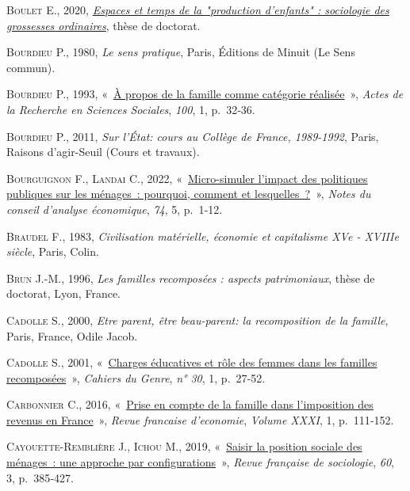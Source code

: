 \documentclass[
  12pt,
]{book}
\newlength{\cslhangindent}
\newenvironment{CSLReferences}[2] %
 {\begin{list}{}{%
  \setlength{\itemindent}{0pt}
  \setlength{\leftmargin}{0pt}
  \setlength{\parsep}{0pt}
  \ifodd #1
   \setlength{\leftmargin}{\cslhangindent}
   \setlength{\itemindent}{-1\cslhangindent}
  \fi
  \setlength{\itemsep}{#2\baselineskip}}}
 {\end{list}}
\begin{document}
\begin{CSLReferences}{0}{1}
\textsc{Boulet E.}, 2020,
\emph{\href{https://theses.fr/2020LYSE2034}{Espaces et temps de la
{"}production d'enfants{"} : sociologie des grossesses ordinaires}},
thèse de doctorat.

\textsc{Bourdieu P.}, 1980, \emph{Le sens pratique}, Paris, Éditions de
Minuit (Le Sens commun).

\textsc{Bourdieu P.}, 1993,
{«~\href{https://doi.org/10.3406/arss.1993.3070}{À propos de la famille
comme catégorie réalisée}~»}, \emph{Actes de la Recherche en Sciences
Sociales}, \emph{100}, 1, p.~32‑36.

\textsc{Bourdieu P.}, 2011, \emph{Sur l'État: cours au Collège de
France, 1989-1992}, Paris, Raisons d'agir-Seuil (Cours et travaux).

\textsc{Bourguignon F.}, \textsc{Landai C.}, 2022,
{«~\href{https://doi.org/10.3917/ncae.074.0001}{Micro-simuler l{'}impact
des politiques publiques sur les ménages~: pourquoi, comment et
lesquelles~?}~»}, \emph{Notes du conseil d{'}analyse économique},
\emph{74}, 5, p.~1‑12.

\textsc{Braudel F.}, 1983, \emph{Civilisation matérielle, économie et
capitalisme XVe - XVIIIe siècle}, Paris, Colin.

\textsc{Brun J.-M.}, 1996, \emph{Les familles recomposées : aspects
patrimoniaux}, thèse de doctorat, Lyon, France.

\textsc{Cadolle S.}, 2000, \emph{Etre parent, être beau-parent: la
recomposition de la famille}, Paris, France, Odile Jacob.

\textsc{Cadolle S.}, 2001,
{«~\href{http://www.cairn.info/revue-cahiers-du-genre-2001-1-page-27.htm}{Charges
éducatives et rôle des femmes dans les familles recomposées}~»},
\emph{Cahiers du Genre}, \emph{n° 30}, 1, p.~27‑52.

\textsc{Carbonnier C.}, 2016,
{«~\href{https://www.cairn.info/revue-francaise-d-economie-2016-1-page-111.htm}{Prise
en compte de la famille dans l{'}imposition des revenus en France}~»},
\emph{Revue francaise d'economie}, \emph{Volume XXXI}, 1, p.~111‑152.

\textsc{Cayouette-Remblière J.}, \textsc{Ichou M.}, 2019,
{«~\href{https://doi.org/10.3917/rfs.603.0385}{Saisir la position
sociale des ménages~: une approche par configurations}~»}, \emph{Revue
française de sociologie}, \emph{60}, 3, p.~385‑427.


\end{CSLReferences}
\end{document}
